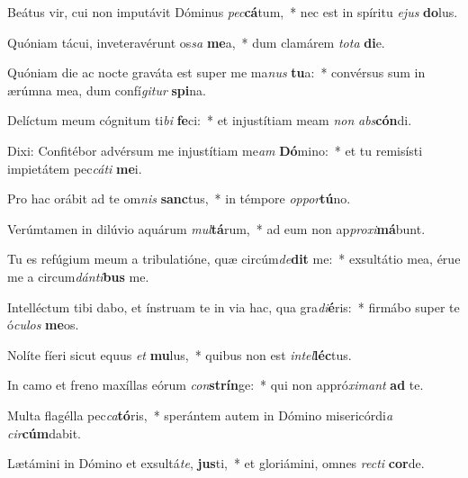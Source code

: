 \item Beátus vir, cui non imputávit Dóminus \textit{pec}\textbf{cá}tum,~* nec est in spíritu \textit{e}\textit{jus} \textbf{do}lus.
\item Quóniam tácui, inveteravérunt os\textit{sa} \textbf{me}a,~* dum clamárem \textit{to}\textit{ta} \textbf{di}e.
\item Quóniam die ac nocte graváta est super me ma\textit{nus} \textbf{tu}a:~* convérsus sum in ærúmna mea, dum confí\textit{gi}\textit{tur} \textbf{spi}na.
\item Delíctum meum cógnitum ti\textit{bi} \textbf{fe}ci:~* et injustítiam meam \textit{non} \textit{abs}\textbf{cón}di.
\item Dixi: Confitébor advérsum me injustítiam me\textit{am} \textbf{Dó}mino:~* et tu remisísti impietátem pec\textit{cá}\textit{ti} \textbf{me}i.
\item Pro hac orábit ad te om\textit{nis} \textbf{sanc}tus,~* in témpore \textit{op}\textit{por}\textbf{tú}no.
\item Verúmtamen in dilúvio aquárum \textit{mul}\textbf{tá}rum,~* ad eum non ap\textit{pro}\textit{xi}\textbf{má}bunt.
\item Tu es refúgium meum a tribulatióne, quæ circúm\textit{de}\textbf{dit} me:~* exsultátio mea, érue me a circum\textit{dán}\textit{ti}\textbf{bus} me.
\item Intelléctum tibi dabo, et ínstruam te in via hac, qua gra\textit{di}\textbf{é}ris:~* firmábo super te ó\textit{cu}\textit{los} \textbf{me}os.
\item Nolíte fíeri sicut equus \textit{et} \textbf{mu}lus,~* quibus non est \textit{in}\textit{tel}\textbf{léc}tus.
\item In camo et freno maxíllas eórum \textit{con}\textbf{strín}ge:~* qui non appró\textit{xi}\textit{mant} \textbf{ad} te.
\item Multa flagélla pec\textit{ca}\textbf{tó}ris,~* sperántem autem in Dómino misericórdi\textit{a} \textit{cir}\textbf{cúm}dabit.
\item Lætámini in Dómino et exsultá\textit{te}, \textbf{jus}ti,~* et gloriámini, omnes \textit{rec}\textit{ti} \textbf{cor}de.
